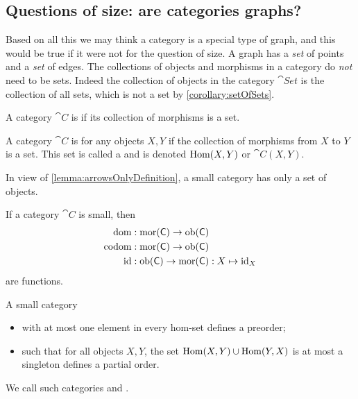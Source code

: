 \subsection{Questions of size: are categories graphs?}
Based on all this we may think a category is a special type of graph, and this would be true if it were not for the question of size. A graph has a \textit{set} of points and a \textit{set} of edges. The collections of objects and morphisms in a category do \emph{not} need to be sets. Indeed the collection of objects in the category $\cat{Set}$ is the collection of all sets, which is not a set by \ref{corollary:setOfSets}.

\begin{definition}
A category $\cat{C}$ is  if its collection of morphisms is a set.

A category $\cat{C}$ is  for any objects $X,Y$ if the collection of morphisms from $X$ to $Y$ is a set. This set is called a  and is denoted $\operatorname{Hom}(X,Y)$ or $\cat{C}(X,Y)$.
\end{definition}
In view of \ref{lemma:arrowsOnlyDefinition}, a small category has only a set of objects.

\begin{lemma}
If a category $\cat{C}$ is small, then
\begin{align*}
\operatorname{dom}&: \operatorname{mor}(\mathsf{C}) \to \operatorname{ob}(\mathsf{C}) \\
\operatorname{codom}&: \operatorname{mor}(\mathsf{C}) \to \operatorname{ob}(\mathsf{C}) \\
\operatorname{id}&: \operatorname{ob}(\mathsf{C}) \to \operatorname{mor}(\mathsf{C}): X\mapsto \operatorname{id}_X
\end{align*}
are functions.
\end{lemma}

\begin{lemma}
A small category
\begin{itemize}
\item with at most one element in every hom-set defines a preorder;
\item such that for all objects $X,Y$, the set $\operatorname{Hom}(X,Y)\cup \operatorname{Hom}(Y,X)$ is at most a singleton defines a partial order.
\end{itemize}
\end{lemma}
We call such categories  and .

